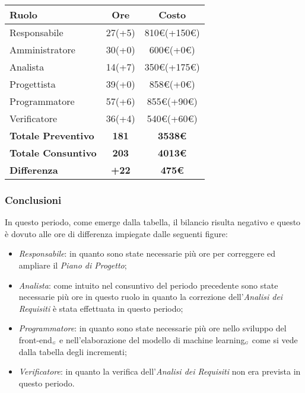 {{{{{{{{{	\quad
	\def\tabularxcolumn#1{m{#1}}
	{
		\begin{center}
			\renewcommand{\arraystretch}{1.4}
			\begin{tabularx}{10cm}{|X|c|c|}
				\hline
				\rowcolor{airforceblue}
				\textbf{Ruolo} & \textbf{Ore} & \textbf{Costo}\\
				\hline
				Responsabile & 27(+5) & 810\euro(+150\euro)\\
				\hline
				Amministratore & 30(+0) & 600\euro(+0\euro)\\
				\hline
				Analista & 14(+7) & 350\euro(+175\euro)\\
				\hline
				Progettista & 39(+0) & 858\euro(+0\euro)\\
				\hline
				Programmatore & 57(+6) & 855\euro(+90\euro)\\
				\hline
				Verificatore & 36(+4) & 540\euro(+60\euro)\\
				\hline
				\textbf{Totale Preventivo} & \textbf{181} & \textbf{3538\euro}\\
				\hline
				\textbf{Totale Consuntivo} & \textbf{203} & \textbf{4013\euro}\\
				\hline
				\textbf{Differenza} & \textbf{+22} & \textbf{475\euro}
			\end{tabularx}
		\end{center}

	\subsubsection{Conclusioni}\label{ConsuntivoSecondoPeriodoDiProgettazioneDiDettaglioCodificaConclusioni}
		In questo periodo, come emerge dalla tabella, il bilancio risulta negativo e questo è dovuto alle ore di differenza impiegate dalle seguenti figure:
		\begin{itemize}
			\item \textit{Responsabile}: in quanto sono state necessarie più ore per correggere ed ampliare il \textit{Piano di Progetto};
			\item \textit{Analista}: come intuito nel consuntivo del periodo precedente sono state necessarie più ore in questo ruolo in quanto la correzione dell'\textit{Analisi dei Requisiti} è stata effettuata in questo periodo;
			\item \textit{Programmatore}: in quanto sono state necessarie più ore nello sviluppo del front-end$_{\scaleto{G}{3pt}}$ e nell'elaborazione del modello di machine learning$_{\scaleto{G}{3pt}}$ come si vede dalla tabella degli incrementi;
			\item \textit{Verificatore}: in quanto la verifica dell'\textit{Analisi dei Requisiti} non era prevista in questo periodo.
		\end{itemize}

}}}}}}}}}}
